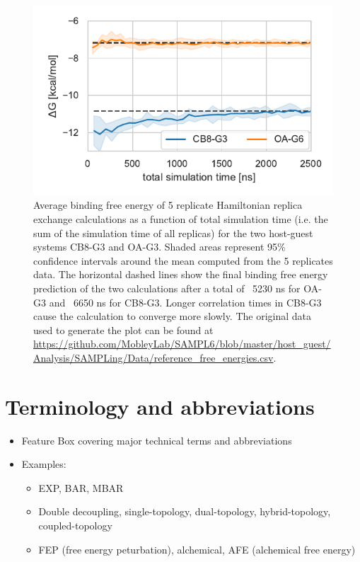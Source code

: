 \documentclass[9pt,bestpractices]{livecoms}
\begin{document}
\begin{figure}
    \includegraphics[width=0.95\linewidth]{fig6/free_energy_trajectories.pdf}
    \caption{Average binding free energy of 5 replicate Hamiltonian replica exchange calculations as a function of total simulation time (i.e. the sum of the simulation time of all replicas) for the two host-guest systems CB8-G3 and OA-G3. Shaded areas represent 95\% confidence intervals around the mean computed from the 5 replicates data. The horizontal dashed lines show the final binding free energy prediction of the two calculations after a total of ~5230 ns for OA-G3 and ~6650 ns for CB8-G3. Longer correlation times in CB8-G3 cause the calculation to converge more slowly. The original data used to generate the plot can be found at \url{https://github.com/MobleyLab/SAMPL6/blob/master/host_guest/Analysis/SAMPLing/Data/reference_free_energies.csv}.
}
    \label{fig:freeenergytrajectories}
\end{figure}

\section{Terminology and abbreviations}
\label{sec:tem-abbrev}
\begin{itemize}
\item Feature Box covering major technical terms and abbreviations
\item Examples:
\begin{itemize}
\item EXP, BAR, MBAR
\item Double decoupling, single-topology, dual-topology, hybrid-topology, coupled-topology
\item FEP (free energy peturbation), alchemical, AFE (alchemical free energy)
\end{itemize}
\end{itemize}
\end{document}
